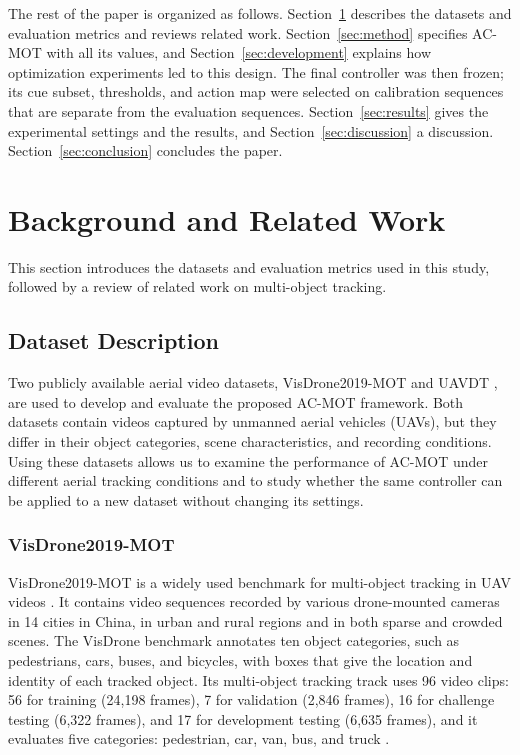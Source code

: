 \documentclass[pdflatex,sn-mathphys-num,iicol]{sn-jnl}
\begin{document}
The rest of the paper is organized as follows. Section~\ref{sec:related}
describes the datasets and evaluation metrics and reviews related work.
Section~\ref{sec:method} specifies AC-MOT with all its values, and
Section~\ref{sec:development} explains how optimization experiments led to
this design. The final controller was then frozen; its cue subset,
thresholds, and action map were selected on calibration sequences that are
separate from the evaluation sequences.
Section~\ref{sec:results} gives the experimental settings and the results,
and Section~\ref{sec:discussion} a discussion. Section~\ref{sec:conclusion} concludes the paper.
\section{Background and Related Work}\label{sec:related}
This section introduces the datasets and evaluation metrics used in this study, followed by a review of related work on multi-object tracking.

\subsection{Dataset Description}\label{sec:datasets}
Two publicly available aerial video datasets, VisDrone2019-MOT
\cite{zhu2022visdrone} and UAVDT \cite{du2018uavdt}, are used to develop and evaluate the proposed AC-MOT framework. Both datasets contain videos captured by unmanned aerial vehicles (UAVs), but they differ in their object categories, scene characteristics, and recording conditions. Using these datasets allows us to examine the performance of AC-MOT under different aerial tracking conditions and to study whether the same controller can be applied to a new dataset without changing its settings.

\subsubsection{VisDrone2019-MOT}
VisDrone2019-MOT is a widely used benchmark for multi-object tracking in UAV
videos \cite{zhu2022visdrone}. It contains video sequences recorded by various
drone-mounted cameras in 14 cities in China, in urban and rural regions and in
both sparse and crowded scenes. The VisDrone benchmark annotates ten object
categories, such as pedestrians, cars, buses, and bicycles, with boxes that
give the location and identity of each tracked object. Its multi-object
tracking track uses 96 video clips: 56 for training (24,198 frames), 7 for
validation (2,846 frames), 16 for challenge testing (6,322 frames), and 17 for
development testing (6,635 frames), and it evaluates five categories:
pedestrian, car, van, bus, and truck \cite{zhu2022visdrone}.
\end{document}
